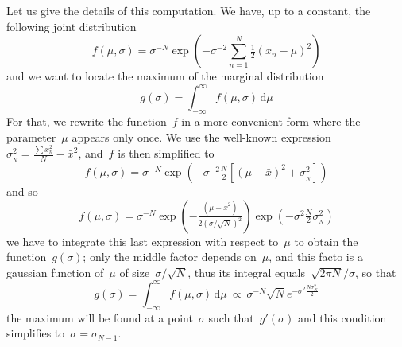Let us give the details of this computation.  We have, up to a constant, the
following joint distribution
$$
f(\mu,\sigma)=\sigma^{-N}\exp\left(
-\sigma^{-2}\sum_{n=1}^N\tfrac{1}{2}\left(x_n-\mu\right)^2
\right)
$$
and we want to locate the maximum of the marginal distribution
$$
g(\sigma)=\int_{-\infty}^\infty f(\mu,\sigma)\,\mathrm{d}\mu
$$
For that, we rewrite the function~$f$ in a more convenient form where the
parameter~$\mu$ appears only once.  We use the
well-known expression~$\sigma_{{}_N}^2=\frac{\sum x_n^2}{N}-\bar x^2$,
and~$f$ is then simplified to
$$
f(\mu,\sigma)=\sigma^{-N}\exp\left(
-\sigma^{-2}\tfrac{N}{2}\left[(\mu-\bar x)^2+\sigma_{{}_N}^2\right]
\right)
$$
and so
$$
f(\mu,\sigma)=\sigma^{-N}\exp\left(
-\tfrac{\left(\mu-\bar x^2\right)}{2\left(\sigma/\sqrt{N}\right)^2}
\right)
\exp\left(-\sigma^2\tfrac{N}{2}\sigma_{{}_N}^2
\right)
$$
we have to integrate this last expression with respect to~$\mu$ to obtain the
function~$g(\sigma)$; only the middle factor depends on~$\mu$, and this facto
is a gaussian function of~$\mu$ of size~$\sigma/\sqrt{N}$, thus its integral
equals~$\sqrt{2\pi N}/\sigma$, so that
$$
g(\sigma)
=
\int_{-\infty}^\infty f(\mu,\sigma)\,\mathrm{d}\mu
\ \propto\ %
\sigma^{-N}\sqrt{N}e^{-\sigma^2\frac{N\sigma_N^2}{2}}
$$
the maximum will be found at a point~$\sigma$ such that~$g'(\sigma)$
and this condition simplifies to~$\sigma=\sigma_{N-1}$.



